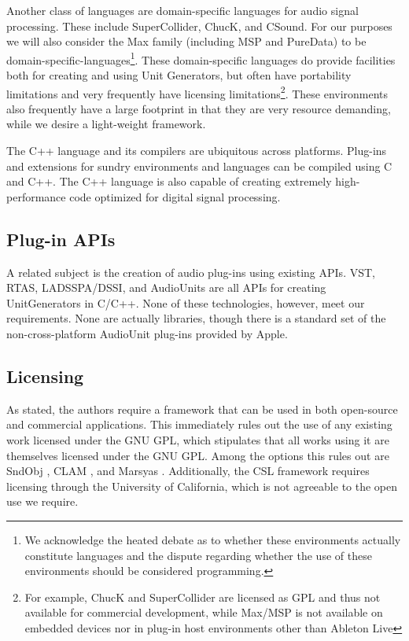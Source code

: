 \documentclass[twoside,10pt]{article}
\begin{document}
Another class of languages are domain-specific languages for audio signal processing.  These include SuperCollider\cite{McCartney:1996}, ChucK\cite{wang:2008}, and CSound.  For our purposes we will also consider the Max family (including MSP\cite{Zicarelli:1998} and PureData\cite{Puckette:1996}) to be domain-specific-languages\footnote{We acknowledge the heated debate as to whether these environments actually constitute languages and the dispute regarding whether the use of these environments should be considered programming.}.  These domain-specific languages do provide facilities both for creating and using Unit Generators, but often have portability limitations and very frequently have licensing limitations\footnote{For example, ChucK and SuperCollider are licensed as GPL and thus not available for commercial development, while Max/MSP is not available on embedded devices nor in plug-in host environments other than Ableton Live}.  These environments also frequently have a large footprint in that they are very resource demanding, while we desire a light-weight framework.

The C++ language and its compilers are ubiquitous across platforms.  Plug-ins and extensions for sundry environments and languages can be compiled using C and C++.  The C++ language is also capable of creating extremely high-performance code optimized for digital signal processing.



\subsection{Plug-in APIs} %

A related subject is the creation of audio plug-ins using existing APIs.  VST, RTAS, LADSSPA/DSSI, and AudioUnits are all APIs for creating UnitGenerators in C/C++.  None of these technologies, however, meet our requirements.  None are actually libraries, though there is a standard set of the non-cross-platform AudioUnit plug-ins provided by Apple.



\subsection{Licensing} %

As stated, the authors require a framework that can be used in both open-source and commercial applications.  This immediately rules out the use of any existing work licensed under the GNU GPL, which stipulates that all works using it are themselves licensed under the GNU GPL.  Among the options this rules out are SndObj \cite{Lazzarini:2001}, CLAM \cite{Amatraian:2008}, and Marsyas \cite{Tzanetakis:2008}.  Additionally, the CSL framework \cite{Pope:2003} requires licensing through the University of California, which is not agreeable to the open use we require.
\end{document}
